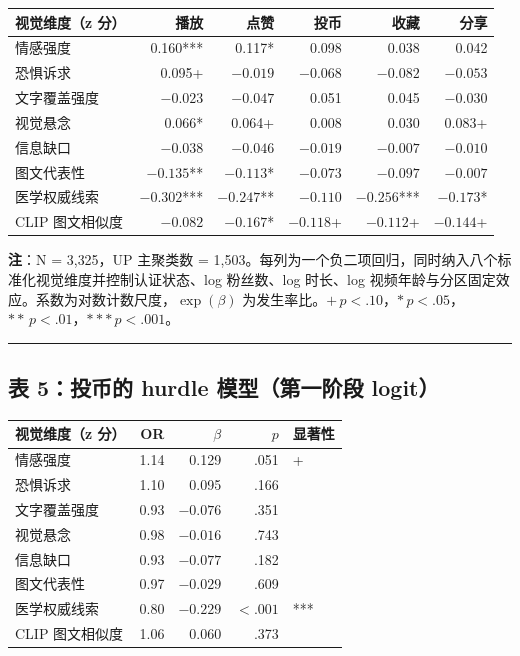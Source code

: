 \documentclass[
  fontset=none]{ctexart}
\begin{document}
\begin{longtable}[]{@{}lrrrrr@{}}
\toprule\noalign{}
视觉维度（z 分） & 播放 & 点赞 & 投币 & 收藏 & 分享 \\
\midrule\noalign{}
\endhead
\bottomrule\noalign{}
\endlastfoot
情感强度 & 0.160*** & 0.117* & 0.098 & 0.038 & 0.042 \\
恐惧诉求 & 0.095+ & \(-0.019\) & \(-0.068\) & \(-0.082\) & \(-0.053\) \\
文字覆盖强度 & \(-0.023\) & \(-0.047\) & 0.051 & 0.045 & \(-0.030\) \\
视觉悬念 & 0.066* & 0.064+ & 0.008 & 0.030 & 0.083+ \\
信息缺口 & \(-0.038\) & \(-0.046\) & \(-0.019\) & \(-0.007\) & \(-0.010\) \\
图文代表性 & \(-0.135\)** & \(-0.113\)* & \(-0.073\) & \(-0.097\) & \(-0.007\) \\
医学权威线索 & \(-0.302\)*** & \(-0.247\)** & \(-0.110\) & \(-0.256\)*** & \(-0.173\)* \\
CLIP 图文相似度 & \(-0.082\) & \(-0.167\)* & \(-0.118\)+ & \(-0.112\)+ & \(-0.144\)+ \\
\end{longtable}

\textbf{注}：N = 3{,}325，UP 主聚类数 = 1{,}503。每列为一个负二项回归，同时纳入八个标准化视觉维度并控制认证状态、log 粉丝数、log 时长、log 视频年龄与分区固定效应。系数为对数计数尺度，\(\exp(\beta)\) 为发生率比。\(+\,p<.10\)，\(*\,p<.05\)，\(**\,p<.01\)，\(***\,p<.001\)。

\begin{center}\rule{0.5\linewidth}{0.5pt}\end{center}

\subsection{表 5：投币的 hurdle 模型（第一阶段 logit）}\label{ux8868-5}

\begin{longtable}[]{@{}lrrrl@{}}
\toprule\noalign{}
视觉维度（z 分） & OR & \(\beta\) & \(p\) & 显著性 \\
\midrule\noalign{}
\endhead
\bottomrule\noalign{}
\endlastfoot
情感强度 & 1.14 & 0.129 & .051 & + \\
恐惧诉求 & 1.10 & 0.095 & .166 &  \\
文字覆盖强度 & 0.93 & \(-0.076\) & .351 &  \\
视觉悬念 & 0.98 & \(-0.016\) & .743 &  \\
信息缺口 & 0.93 & \(-0.077\) & .182 &  \\
图文代表性 & 0.97 & \(-0.029\) & .609 &  \\
医学权威线索 & 0.80 & \(-0.229\) & \(<.001\) & *** \\
CLIP 图文相似度 & 1.06 & 0.060 & .373 &  \\
\end{longtable}
\end{document}
